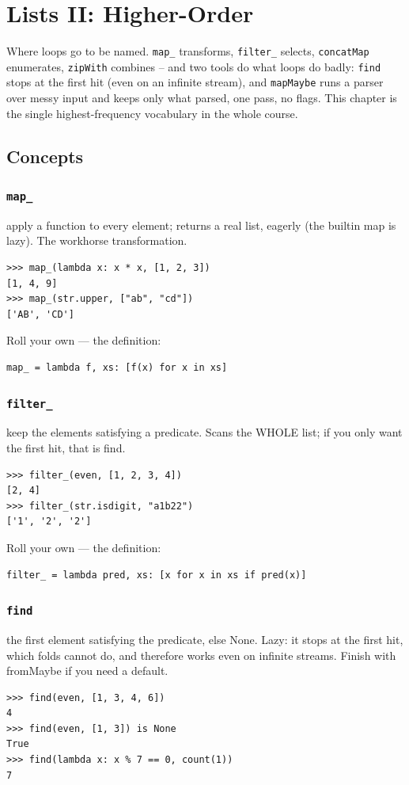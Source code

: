 \documentclass[10pt,letterpaper]{book}
\begin{document}
\clearpage
\chapter{Lists II: Higher-Order}

Where loops go to be named. \texttt{map\_} transforms, \texttt{filter\_}
selects, \texttt{concatMap} enumerates, \texttt{zipWith} combines --
and two tools do what loops do badly: \texttt{find} stops at the first hit
(even on an infinite stream), and \texttt{mapMaybe} runs a parser over messy
input and keeps only what parsed, one pass, no flags. This chapter is the
single highest-frequency vocabulary in the whole course.
\section{Concepts}
\subsection{\texttt{map\_}}\label{def:map-}
apply a function to every element; returns a real list, eagerly (the builtin map is lazy). The workhorse transformation.
\begin{lstlisting}[style=ex]
>>> map_(lambda x: x * x, [1, 2, 3])
[1, 4, 9]
>>> map_(str.upper, ["ab", "cd"])
['AB', 'CD']
\end{lstlisting}

Roll your own --- the definition:

\begin{lstlisting}[style=ex]
map_ = lambda f, xs: [f(x) for x in xs]
\end{lstlisting}
\subsection{\texttt{filter\_}}\label{def:filter-}
keep the elements satisfying a predicate. Scans the WHOLE list; if you only want the first hit, that is find.
\begin{lstlisting}[style=ex]
>>> filter_(even, [1, 2, 3, 4])
[2, 4]
>>> filter_(str.isdigit, "a1b22")
['1', '2', '2']
\end{lstlisting}

Roll your own --- the definition:

\begin{lstlisting}[style=ex]
filter_ = lambda pred, xs: [x for x in xs if pred(x)]
\end{lstlisting}
\subsection{\texttt{find}}\label{def:find}
the first element satisfying the predicate, else None. Lazy: it stops at the first hit, which folds cannot do, and therefore works even on infinite streams. Finish with fromMaybe if you need a default.
\begin{lstlisting}[style=ex]
>>> find(even, [1, 3, 4, 6])
4
>>> find(even, [1, 3]) is None
True
>>> find(lambda x: x % 7 == 0, count(1))
7
\end{lstlisting}
\end{document}
